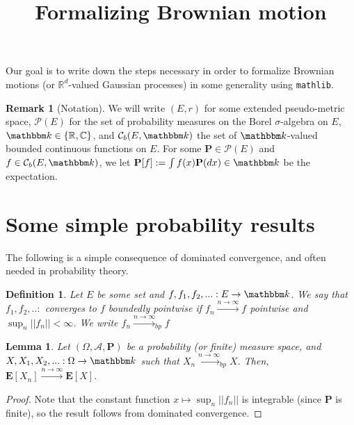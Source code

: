 \documentclass{article}
\newtheorem{lemma}[proposition]{Lemma}
\newtheorem{definition}[proposition]{Definition}
\theoremstyle{definition}
\newtheorem{remark}[proposition]{Remark}
\theoremstyle{step} \newtheorem{step}{Step}
\begin{document}
\title{\LARGE Formalizing Brownian motion}

\maketitle Our goal is to write down the steps necessary in order to
formalize Brownian motions (or $\mathbb R^d$-valued Gaussian
processes) in some generality using {\tt mathlib}.

\begin{remark}[Notation]
We will write $(E,r)$ for some extended pseudo-metric space, $\mathcal
P(E)$ for the set of probability measures on the Borel
$\sigma$-algebra on $E$, $\mathbbm k \in \{\mathbb R, \mathbb C\}$,
and $\mathcal C_{b}(E, \mathbbm k)$ the set of $\mathbbm k$-valued
bounded continuous functions on $E$. For some $\mathbf P \in \mathcal
P(E)$ and $f \in \mathcal C_{b}(E, \mathbbm k)$, we let $\mathbf P[f]
:= \int f(x) \mathbf P(dx) \in \mathbbm k$ be the expectation.
\end{remark}

\setcounter{section}{-1}
\section{Some simple probability results}
The following is a simple consequence of dominated convergence, and
often needed in probability theory.

\begin{definition}
  Let $E$ be some set and $f, f_1, f_2,...: E \to \mathbbm k$. We say
  that $f_1,f_2,..:$ converges to $f$ boundedly pointwise if $f_n
  \xrightarrow{n\to\infty} f$ pointwise and $\sup_n ||f_n|| <
  \infty$. We write $f_n \xrightarrow{n\to\infty}_{bp} f$
\end{definition}

\begin{lemma}\label{lemma:bp}
  Let $(\Omega, \mathcal A, \mathbf P)$ be a probability (or finite)
  measure space, and $X, X_1, X_2,... : \Omega \to \mathbbm k$ such
  that $X_n \xrightarrow{n\to\infty}_{bp} X$. Then, $\mathbf E[X_n]
  \xrightarrow{n\to\infty} \mathbf E[X]$.
\end{lemma}

\begin{proof}
  Note that the constant function $x \mapsto \sup_n ||f_n||$ is
  integrable (since $\mathbf P$ is finite), so the result follows from
  dominated convergence.
\end{proof}
\end{document}
